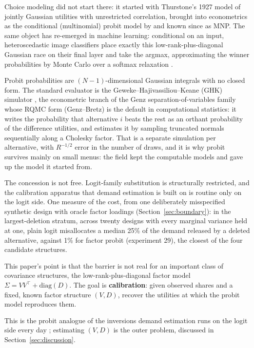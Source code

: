 \documentclass[12pt]{article}
\theoremstyle{remark}
\begin{document}
Choice modeling did not start there: it started with Thurstone's 1927 model
\citep{thurstone1927} of jointly Gaussian utilities with unrestricted
correlation, brought into econometrics as the conditional (multinomial)
probit model by \citet{hausman1978} and known since as MNP. The same
object has re-emerged in machine learning: conditional on an input,
heteroscedastic image classifiers place exactly this
low-rank-plus-diagonal Gaussian race on their final layer and take the
argmax, approximating the winner probabilities by Monte Carlo over a
softmax relaxation \citep{collier2021}.

Probit probabilities are $(N-1)$-dimensional Gaussian integrals with no
closed form. The standard evaluator is the Geweke--Hajivassiliou--Keane
(GHK) simulator \citep{geweke1994,hajivassiliou1998,train2009}, the
econometric branch of the Genz separation-of-variables family
\citep{genz1992} whose RQMC form (Genz--Bretz) is the default in
computational statistics: it writes
the probability that alternative $i$ beats the rest as an orthant
probability of the difference utilities, and estimates it by sampling
truncated normals sequentially along a Cholesky factor. That is a separate simulation per alternative, with $R^{-1/2}$ error in
the number of draws, and it is why probit survives mainly on small menus:
the field kept the computable models and gave up the model it started
from.

The concession is not free. Logit-family substitution is structurally
restricted, and the calibration apparatus that demand estimation is built
on is routine only on the logit side. One measure of the cost, from one deliberately misspecified synthetic
design with oracle factor loadings (Section~\ref{sec:boundary}): in the
largest-deletion stratum, across twenty designs with every marginal
variance held at one, plain logit misallocates a median 25\% of the
demand released by a deleted alternative, against 1\% for factor probit
(experiment 29), the
closest of the four candidate structures.

This paper's point is that the barrier is not real for an important
class of covariance structures, the low-rank-plus-diagonal factor model
$\Sigma = VV^\top + \mathrm{diag}(D)$. The goal is \textbf{calibration}: given
observed shares and a fixed, known factor structure $(V, D)$, recover the
utilities at which the probit model reproduces them.

This is the probit
analogue of the inversions demand estimation runs on the logit side every
day \citep{berry1995,conlon2020}; estimating $(V, D)$ is the outer problem,
discussed in Section~\ref{sec:discussion}.
\end{document}
